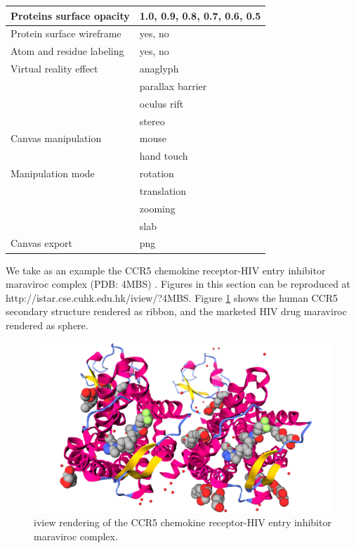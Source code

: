 \begin{table}
\begin{tabular}{ll}
\hline
 Proteins surface opacity & 1.0, 0.9, 0.8, 0.7, 0.6, 0.5\\
\hline
Protein surface wireframe & yes, no\\
\hline
Atom and residue labeling & yes, no\\
\hline
   Virtual reality effect & anaglyph\\
                          & parallax barrier\\
                          & oculus rift\\
                          & stereo\\
\hline
      Canvas manipulation & mouse\\
                          & hand touch\\
\hline
        Manipulation mode & rotation\\
                          & translation\\
                          & zooming\\
                          & slab\\
\hline
            Canvas export & png\\
\hline
\end{tabular}
\end{table}

We take as an example the CCR5 chemokine receptor-HIV entry inhibitor maraviroc complex (PDB: 4MBS) \citep{1348}. Figures in this section can be reproduced at http://istar.cse.cuhk.edu.hk/iview/?4MBS. Figure \ref{iview:ribbon} shows the human CCR5 secondary structure rendered as ribbon, and the marketed HIV drug maraviroc rendered as sphere.

\begin{figure}
\begin{center}
\includegraphics[width=\linewidth]{../iview/ribbon.png}
\end{center}
\caption{iview rendering of the CCR5 chemokine receptor-HIV entry inhibitor maraviroc complex.}
\label{iview:ribbon}
\end{figure}

